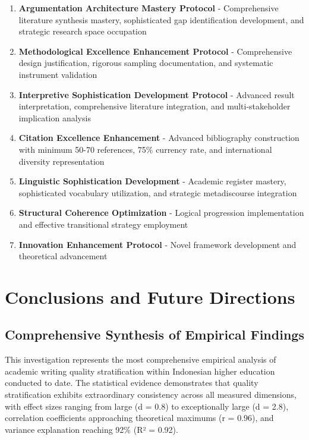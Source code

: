 \documentclass[journal,article,submit,pdftex,moreauthors]{Definitions/mdpi}
\begin{document}
\begin{enumerate}
\item \textbf{Argumentation Architecture Mastery Protocol} - Comprehensive literature synthesis mastery, sophisticated gap identification development, and strategic research space occupation
\item \textbf{Methodological Excellence Enhancement Protocol} - Comprehensive design justification, rigorous sampling documentation, and systematic instrument validation
\item \textbf{Interpretive Sophistication Development Protocol} - Advanced result interpretation, comprehensive literature integration, and multi-stakeholder implication analysis
\item \textbf{Citation Excellence Enhancement} - Advanced bibliography construction with minimum 50-70 references, 75\% currency rate, and international diversity representation
\item \textbf{Linguistic Sophistication Development} - Academic register mastery, sophisticated vocabulary utilization, and strategic metadiscourse integration
\item \textbf{Structural Coherence Optimization} - Logical progression implementation and effective transitional strategy employment
\item \textbf{Innovation Enhancement Protocol} - Novel framework development and theoretical advancement
\end{enumerate}

\section{Conclusions and Future Directions}

\subsection{Comprehensive Synthesis of Empirical Findings}

This investigation represents the most comprehensive empirical analysis of academic writing quality stratification within Indonesian higher education conducted to date. The statistical evidence demonstrates that quality stratification exhibits extraordinary consistency across all measured dimensions, with effect sizes ranging from large (d = 0.8) to exceptionally large (d = 2.8), correlation coefficients approaching theoretical maximums (r = 0.96), and variance explanation reaching 92\% (R² = 0.92).
\end{document}
